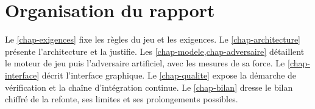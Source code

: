 \section{Organisation du rapport}

Le \cref{chap-exigences} fixe les règles du jeu et les exigences. Le
\cref{chap-architecture} présente l'architecture et la justifie. Les
\cref{chap-modele,chap-adversaire} détaillent le moteur de jeu puis l'adversaire
artificiel, avec les mesures de sa force. Le \cref{chap-interface} décrit l'interface
graphique. Le \cref{chap-qualite} expose la démarche de vérification et la chaîne
d'intégration continue. Le \cref{chap-bilan} dresse le bilan chiffré de la refonte, ses
limites et ses prolongements possibles.
